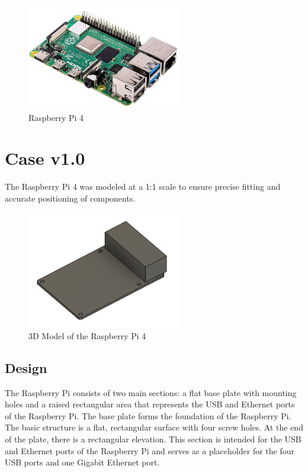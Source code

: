 \begin{figure}[H]
  \centering
  \includegraphics[width=0.6\textwidth]{assets/Raspi.png}
  \caption{Raspberry Pi 4}
\end{figure}

\section{Case v1.0}
The Raspberry Pi 4 was modeled at a 1:1 scale to ensure precise fitting and accurate positioning of components.

\begin{figure}[H]
  \centering
  \includegraphics[width=0.6\textwidth]{assets/DG_Raspi4(1)}
  \caption{3D Model of the Raspberry Pi 4}
\end{figure}

\subsection{Design}
The Raspberry Pi consists of two main sections: a flat base plate with mounting holes and a raised rectangular area that represents the USB and Ethernet ports of the Raspberry Pi.
The base plate forms the foundation of the Raspberry Pi. The basic structure is a flat, rectangular surface with four screw holes. At the end of the plate, there is a rectangular elevation. This section is intended for the USB and Ethernet ports of the Raspberry Pi and serves as a placeholder for the four USB ports and one Gigabit Ethernet port.

